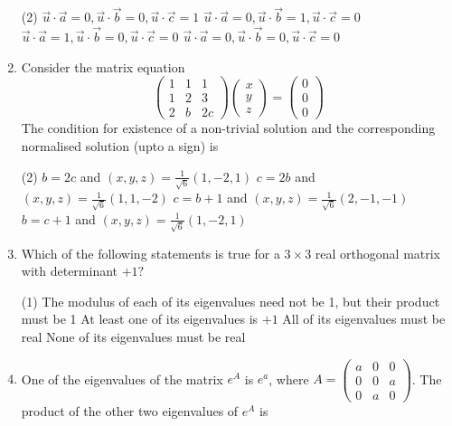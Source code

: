 \begin{enumerate}[label=\color{ocre}\textbf{\arabic*.}]
	{}
	\begin{tasks}(2)
		\task[\textbf{A.}] $\vec{u} \cdot \vec{a}=0, \vec{u} \cdot \vec{b}=0, \vec{u} \cdot \vec{c}=1$
		\task[\textbf{B.}]  $\vec{u} \cdot \vec{a}=0, \vec{u} \cdot \vec{b}=1, \vec{u} \cdot \vec{c}=0$
		\task[\textbf{C.}] $\vec{u} \cdot \vec{a}=1, \vec{u} \cdot \vec{b}=0, \vec{u} \cdot \vec{c}=0$
		\task[\textbf{D.}]  $\vec{u} \cdot \vec{a}=0, \vec{u} \cdot \vec{b}=0, \vec{u} \cdot \vec{c}=0$
	\end{tasks}
	\item Consider the matrix equation
	$$
	\left(\begin{array}{llc}
	1 & 1 & 1 \\
	1 & 2 & 3 \\
	2 & b & 2 c
	\end{array}\right)\left(\begin{array}{l}
	x \\
	y \\
	z
	\end{array}\right)=\left(\begin{array}{l}
	0 \\
	0 \\
	0
	\end{array}\right)
	$$
	The condition for existence of a non-trivial solution and the corresponding normalised solution (upto a sign) is
	{}
	\begin{tasks}(2)
		\task[\textbf{A.}] $b=2 c$ and $(x, y, z)=\frac{1}{\sqrt{6}}(1,-2,1)$
		\task[\textbf{B.}] $c=2 b$ and $(x, y, z)=\frac{1}{\sqrt{6}}(1,1,-2)$
		\task[\textbf{C.}] $c=b+1$ and $(x, y, z)=\frac{1}{\sqrt{6}}(2,-1,-1)$
		\task[\textbf{D.}] $b=c+1$ and $(x, y, z)=\frac{1}{\sqrt{6}}(1,-2,1)$
	\end{tasks}
	\item  Which of the following statements is true for a $3 \times 3$ real orthogonal matrix with determinant $+1 ?$
	{}
	\begin{tasks}(1)
		\task[\textbf{A.}] The modulus of each of its eigenvalues need not be 1, but their product must be 1
		\task[\textbf{B.}] At least one of its eigenvalues is $+1$
		\task[\textbf{C.}] All of its eigenvalues must be real
		\task[\textbf{D.}]  None of its eigenvalues must be real
	\end{tasks}
	\item One of the eigenvalues of the matrix $e^{A}$ is $e^{a}$, where $A=\left(\begin{array}{ccc}a & 0 & 0 \\ 0 & 0 & a \\ 0 & a & 0\end{array}\right)$. The product of the other two eigenvalues of $e^{A}$ is

\end{enumerate}
